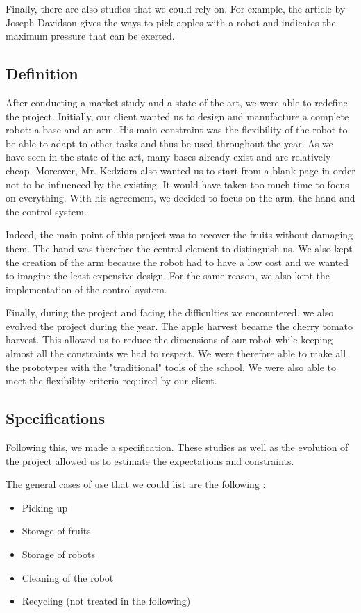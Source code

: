 \bigbreak
Finally, there are also studies that we could rely on. For example, the article by Joseph Davidson \cite{Davidson-2016-126540} gives the ways to pick apples with a robot and indicates the maximum pressure that can be exerted.

\subsection{Definition}

After conducting a market study and a state of the art, we were able to redefine the project. Initially, our client wanted us to design and manufacture a complete robot: a base and an arm. His main constraint was the flexibility of the robot to be able to adapt to other tasks and thus be used throughout the year. As we have seen in the state of the art, many bases already exist and are relatively cheap. Moreover, Mr. Kedziora also wanted us to start from a blank page in order not to be influenced by the existing. It would have taken too much time to focus on everything. With his agreement, we decided to focus on the arm, the hand and the control system. 

\bigbreak
Indeed, the main point of this project was to recover the fruits without damaging them. The hand was therefore the central element to distinguish us. We also kept the creation of the arm because the robot had to have a low cost and we wanted to imagine the least expensive design. For the same reason, we also kept the implementation of the control system. 

\bigbreak
Finally, during the project and facing the difficulties we encountered, we also evolved the project during the year. The apple harvest became the cherry tomato harvest. This allowed us to reduce the dimensions of our robot while keeping almost all the constraints we had to respect. We were therefore able to make all the prototypes with the "traditional" tools of the school. We were also able to meet the flexibility criteria required by our client. 

\subsection{Specifications}

Following this, we made a specification. These studies as well as the evolution of the project allowed us to estimate the expectations and constraints. 

\bigbreak
\noindent The general cases of use that we could list are the following : 
\begin{itemize}[noitemsep]
    \item Picking up
    \item Storage of fruits
    \item Storage of robots
    \item Cleaning of the robot
    \item Recycling (not treated in the following)
\end{itemize}


